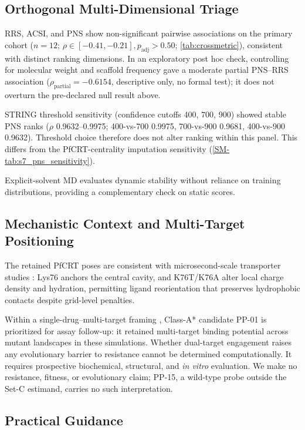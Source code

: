 \documentclass[11pt,a4paper]{article}
\begin{document}
\subsection{Orthogonal Multi-Dimensional Triage}

RRS, ACSI, and PNS show non-significant pairwise associations on the primary cohort ($n=\num{12}$; $\rho \in [-0.41, -0.21], p_{\text{adj}} > 0.50$; \cref{tab:crossmetric}), consistent with distinct ranking dimensions. In an exploratory post hoc check, controlling for molecular weight and scaffold frequency gave a moderate partial PNS--RRS association ($\rho_{\mathrm{partial}} = -0.6154$, descriptive only, no formal test); it does not overturn the pre-declared null result above.

STRING threshold sensitivity (confidence cutoffs 400, 700, 900) showed stable PNS ranks ($\rho$ \numrange{0.9632}{0.9975}; 400-vs-700 \num{0.9975}, 700-vs-900 \num{0.9681}, 400-vs-900 \num{0.9632}). Threshold choice therefore does not alter ranking within this panel. This differs from the PfCRT-centrality imputation sensitivity (\cref{SM-tab:s7_pns_sensitivity}).

Explicit-solvent MD evaluates dynamic stability without reliance on training distributions, providing a complementary check on static scores.

\subsection{Mechanistic Context and Multi-Target Positioning}

The retained PfCRT poses are consistent with microsecond-scale transporter studies \citep{tanner2025pfcrt}: Lys76 anchors the central cavity, and K76T/K76A alter local charge density and hydration, permitting ligand reorientation that preserves hydrophobic contacts despite grid-level penalties.

Within a single-drug--multi-target framing \citep{polypharmacology_malaria_2026}, Class-A* candidate PP-01 is prioritized for assay follow-up: it retained multi-target binding potential across mutant landscapes in these simulations. Whether dual-target engagement raises any evolutionary barrier to resistance cannot be determined computationally. It requires prospective biochemical, structural, and \textit{in vitro} evaluation. We make no resistance, fitness, or evolutionary claim; PP-15, a wild-type probe outside the Set-C estimand, carries no such interpretation.

\subsection{Practical Guidance}
\end{document}

